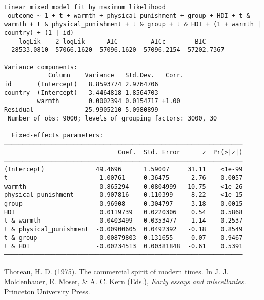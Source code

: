 \documentclass[
  letterpaper,
  DIV=11,
  numbers=noendperiod]{scrreprt}
\newlength{\cslhangindent}
\newenvironment{CSLReferences}[2] %
 {\begin{list}{}{%
  \setlength{\itemindent}{0pt}
  \setlength{\leftmargin}{0pt}
  \setlength{\parsep}{0pt}
  \ifodd #1
   \setlength{\leftmargin}{\cslhangindent}
   \setlength{\itemindent}{-1\cslhangindent}
  \fi
  \setlength{\itemsep}{#2\baselineskip}}}
 {\end{list}}
\begin{document}
\begin{verbatim}
Linear mixed model fit by maximum likelihood
 outcome ~ 1 + t + warmth + physical_punishment + group + HDI + t & warmth + t & physical_punishment + t & group + t & HDI + (1 + warmth | country) + (1 | id)
    logLik   -2 logLik      AIC         AICc        BIC     
 -28533.0810  57066.1620  57096.1620  57096.2154  57202.7367

Variance components:
            Column    Variance   Std.Dev.   Corr.
id       (Intercept)   8.8593774 2.9764706
country  (Intercept)   3.4464818 1.8564703
         warmth        0.0002394 0.0154717 +1.00
Residual              25.9905210 5.0980899
 Number of obs: 9000; levels of grouping factors: 3000, 30

  Fixed-effects parameters:
─────────────────────────────────────────────────────────────────
                               Coef.  Std. Error      z  Pr(>|z|)
─────────────────────────────────────────────────────────────────
(Intercept)              49.4696      1.59007     31.11    <1e-99
t                         1.00761     0.36475      2.76    0.0057
warmth                    0.865294    0.0804999   10.75    <1e-26
physical_punishment      -0.907816    0.110399    -8.22    <1e-15
group                     0.96908     0.304797     3.18    0.0015
HDI                       0.0119739   0.0220306    0.54    0.5868
t & warmth                0.0403499   0.0353477    1.14    0.2537
t & physical_punishment  -0.00900605  0.0492392   -0.18    0.8549
t & group                 0.00879803  0.131655     0.07    0.9467
t & HDI                  -0.00234513  0.00381848  -0.61    0.5391
─────────────────────────────────────────────────────────────────
\end{verbatim}

\label{refs}
\begin{CSLReferences}{1}{0}
Thoreau, H. D. (1975). The commercial spirit of modern times. In J. J.
Moldenhauer, E. Moser, \& A. C. Kern (Eds.), \emph{Early essays and
miscellanies}. Princeton University Press.

\end{CSLReferences}
\end{document}
